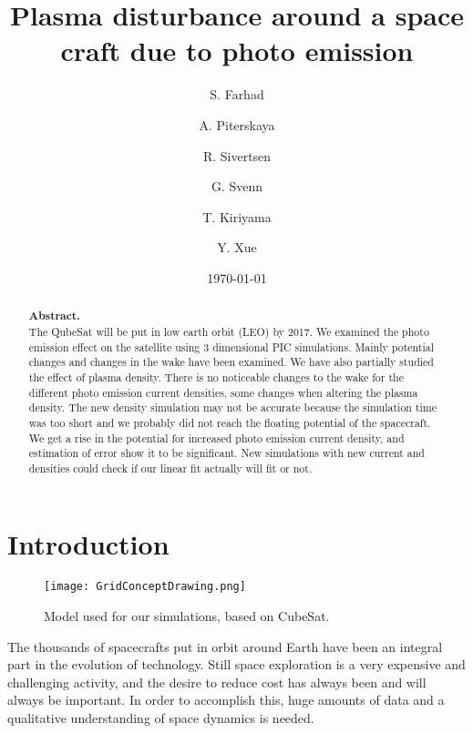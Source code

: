 \documentclass[aip, 
rsi, 
amsmath,
amssymb,
longbibliography,
preprint]{revtex4-1}
\begin{document}
\title[4th 4DSpace Workshop -- Team Godzilla -- Final Report]{Plasma disturbance around a space craft due to photo emission}

\author{S. Farhad} 
\author{A. Piterskaya}
\author{R. Sivertsen}
\author{G. Svenn}

\author{T. Kiriyama}
\author{Y. Xue}

\date{\today}

\begin{abstract}
\textbf{Abstract.}\\
The QubeSat will be put in low earth orbit (LEO) by 2017. We examined the photo emission effect on the satellite using 3 dimensional PIC simulations. Mainly potential changes and changes in the wake have been examined. We have also partially studied the effect of plasma density. There is no noticeable changes to the wake for the different photo emission current densities, some changes when altering the plasma density. The new density simulation may not be accurate because the simulation time was too short and we probably did not reach the floating potential of the spacecraft. We get a rise in the potential for increased photo emission current density, and estimation of error show it to be significant. New simulations with new current and densities could check if our linear fit actually will fit or not.
\end{abstract}

\maketitle

\section{\label{sec:intro} Introduction}

\begin{figure*}[!ht]
\texttt{[image: GridConceptDrawing.png]}
\caption{Model used for our simulations, based on CubeSat.\label{fig:model}}
\end{figure*}

The thousands of spacecrafts put in orbit around Earth have been an integral part in the evolution of technology. Still space exploration is a very expensive and challenging activity, and the desire to reduce cost has always been and will always be important. In order to accomplish this, huge amounts of data and a qualitative understanding of space dynamics is needed. \\
\end{document}
